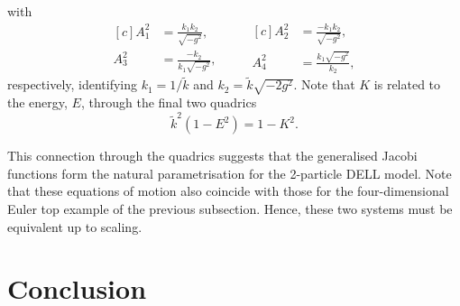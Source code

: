\documentclass[fleqn,11pt,twoside]{article}
\theoremstyle{definition}
\begin{document}
with
\begin{equation}
\begin{aligned}[c]
A_1^2&=\frac{k_1k_2}{\sqrt{-g^2}},\\
A_3^2&=\frac{-k_2}{k_1\sqrt{-g^2}},
\end{aligned}
\qquad
\begin{aligned}[c]
A_2^2&=\frac{-k_1k_2}{\sqrt{-g^2}},\\
A_4^2&=\frac{k_1\sqrt{-g^2}}{k_2},
\end{aligned}
\end{equation}
respectively, identifying $k_1=1/\widetilde{k}$ and $k_2=\widetilde{k}\sqrt{-2g^2}$. 
Note that $K$ is related to the energy, $E$, through the final two quadrics
\begin{equation}
\tilde{k}^2(1-E^2)=1-K^2.
\end{equation}

This connection through the quadrics suggests that the generalised Jacobi functions form the natural parametrisation for the 
2-particle DELL model.  
Note that these equations of motion also coincide with those for the four-dimensional Euler top example of the 
previous subsection. Hence, these two systems must be equivalent up to scaling.
 
\section{Conclusion}
\end{document}
